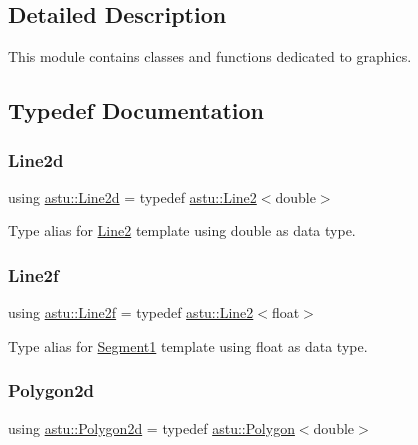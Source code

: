 \subsection{Detailed Description}
This module contains classes and functions dedicated to graphics. 



\subsection{Typedef Documentation}
\mbox{\label{group__math__group_ga9e9519d311982af417c5b7fd50fb4515}} 
\subsubsection{\texorpdfstring{Line2d}{Line2d}}
{\footnotesize\ttfamily using \hyperlink{group__math__group_ga9e9519d311982af417c5b7fd50fb4515}{astu\+::\+Line2d} = typedef \hyperlink{classastu_1_1Line2}{astu\+::\+Line2}$<$double$>$}

Type alias for \hyperlink{classastu_1_1Line2}{Line2} template using double as data type. \mbox{\label{group__math__group_ga6fbecdd0d3f742bdde8f5c000c3a8b5d}} 
\subsubsection{\texorpdfstring{Line2f}{Line2f}}
{\footnotesize\ttfamily using \hyperlink{group__math__group_ga6fbecdd0d3f742bdde8f5c000c3a8b5d}{astu\+::\+Line2f} = typedef \hyperlink{classastu_1_1Line2}{astu\+::\+Line2}$<$float$>$}

Type alias for \hyperlink{classastu_1_1Segment1}{Segment1} template using float as data type. \mbox{\label{group__math__group_gabc60e44721faec63659fd29e46d21522}} 
\subsubsection{\texorpdfstring{Polygon2d}{Polygon2d}}
{\footnotesize\ttfamily using \hyperlink{group__math__group_gabc60e44721faec63659fd29e46d21522}{astu\+::\+Polygon2d} = typedef \hyperlink{classastu_1_1Polygon}{astu\+::\+Polygon}$<$double$>$}

